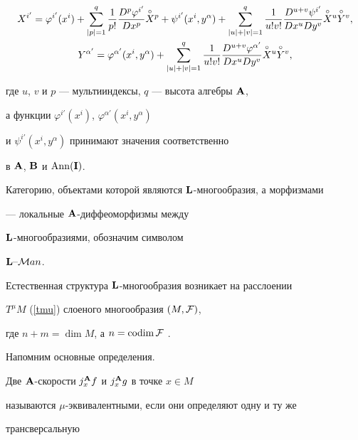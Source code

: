 \begin{gather} \label{t4.1}


X^{i'}=\varphi^{i'}(x^i)+\sum^q_{|p|=1}\frac{1}{p!}


\frac{D^p\varphi^{i'}}{Dx^p}\Xop+


\psi^{i'}(x^i,y^\alpha)+\sum^q_{|u|+|v|=1}\frac{1}{u!v!}


\frac{D^{u+v}\psi^{i'}}{Dx^uDy^v}\overset{\circ}{X}{}^u\overset{\circ}{Y}{}^v, \\


%


\label{t4.2}


Y^{\alpha'}=\varphi^{\alpha'}(x^i,y^\alpha)+\sum^q_{|u|+|v|=1}\frac{1}{u!v!}


\frac{D^{u+v}\varphi^{\alpha'}}{Dx^uDy^v}\overset{\circ}{X}{}^u\overset{\circ}{Y}{}^v,


\end{gather}


где $u$, $v$ и $p$ --- мультииндексы, $q$ --- высота алгебры ${\bold A}$,


а функции $\varphi^{i'}(x^i)$, $\varphi^{\alpha'}(x^i,y^\alpha)$


и $\psi^{i'}(x^i,y^\alpha)$ принимают значения соответственно


в ${\bold A}$, ${\bold B}$ и $\operatorname{Ann}({\bold I})$.





Категорию, объектами которой являются ${\bold L}$-многообразия, а морфизмами


--- локальные ${\bold A}$-диффеоморфизмы между


${\bold L}$-многообразиями, обозначим символом


${\bold L}\text{--}{\cal M}an$.





Естественная структура ${\bold L}$-многообразия возникает на расслоении


$T^\mu M$ (\ref{tmu}) слоеного многообразия $(M,{\cal F})$,


где $n+m=\dim M$, а $n=\operatorname{codim}{\cal F}$ \cite{ShS}.


Напомним основные определения.





Две ${\bold A}$-скорости $j_x^{{\bold A}} f$ и $j_x^{{\bold A}} g$ в точке $x\in M$


называются $\mu$-эквивалентными, если они определяют одну и ту же


трансверсальную


